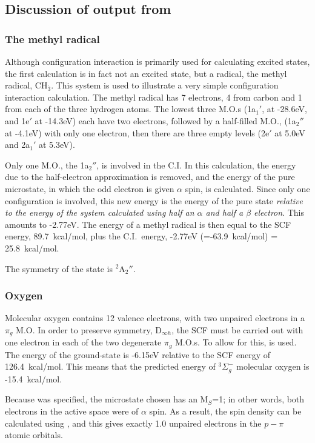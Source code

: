 \subsection{Discussion of output from }
\subsubsection{The methyl radical}
Although configuration interaction is primarily used  for calculating excited
states, the first calculation is in fact not an excited state, but a radical,
the methyl radical, CH$_3^.$. This system is used to illustrate a very simple
configuration interaction calculation.  The methyl radical has 7 electrons, 4
from carbon and 1 from each of the three hydrogen atoms.  The lowest three
M.O.s (1a$_{1}'$, at -28.6eV, and  1e$'$ at -14.3eV)  each have two electrons,
followed by a half-filled M.O., (1a$_{2}''$ at -4.1eV)  with only one electron,
then  there are three empty levels (2e$'$ at 5.0eV and 2a$_{1}'$ at 5.3eV).

Only one M.O., the 1a$_{2}''$, is involved in the C.I. In this calculation, 
the energy due to the half-electron approximation is removed, and the energy 
of the pure microstate, in which the odd electron is given $\alpha$ spin, is 
calculated.  Since only one configuration is involved, this new energy is the
energy of the pure state {\em relative to the energy of the system calculated
using half an $\alpha$ and half a $\beta$ electron}.  This amounts to -2.77eV. 
The energy of a methyl radical is then equal to the SCF energy, 89.7~kcal/mol,
plus the C.I.\ energy, -2.77eV (=-63.9~kcal/mol) = 25.8~kcal/mol.

The symmetry of the state is $^2$A$_{2}''$.

\subsubsection{Oxygen}
Molecular oxygen contains 12 valence electrons, with two unpaired electrons in
a $\pi_g$ M.O.  In order to preserve symmetry, $\mathrm{D}_{\infty h}$, the SCF must be
carried out with one electron in each of the two degenerate $\pi_g$ M.O.s. To
allow for this,  is used.   The energy of the ground-state is
-6.15eV relative to the SCF energy of 126.4~kcal/mol.  This means that the
predicted energy of $^3\Sigma_g^-$ molecular oxygen is -15.4~kcal/mol. 

Because  was specified, the microstate chosen has an M$_S$=1; in
other words, both electrons in the active space were of $\alpha$ spin. As a
result, the spin density can be calculated using , and this gives
exactly 1.0 unpaired electrons in the $p-\pi$ atomic orbitals.  

